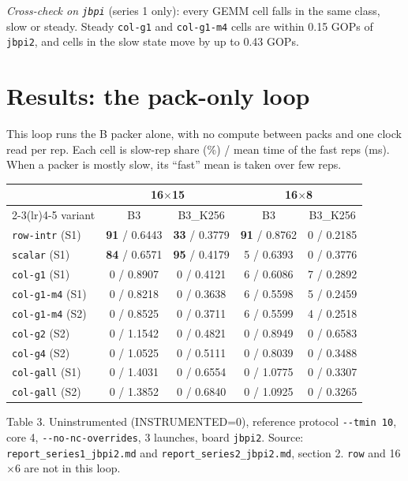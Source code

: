 \documentclass[10pt,a4paper]{article}
\newcommand{\bad}[1]{\textcolor{red!70!black}{\textbf{#1}}}
\begin{document}
\emph{Cross-check on \texttt{jbpi}} (series 1 only): every GEMM cell falls in the same class, slow or steady. Steady \texttt{col-g1} and
\texttt{col-g1-m4} cells are within 0.15 GOPs of \texttt{jbpi2}, and cells in the slow state move by up to 0.43 GOPs.

\clearpage
\section{Results: the pack-only loop}
\label{sec:packonly}
This loop runs the B packer alone, with no compute between packs and one clock read per rep. Each cell is slow-rep share (\%) /
mean time of the fast reps (ms). When a packer is mostly slow, its ``fast'' mean is taken over few reps.

\begin{center}\footnotesize\setlength{\tabcolsep}{4pt}
\begin{tabular}{@{}lcccc@{}}
\toprule
 & \multicolumn{2}{c}{16$\times$15} & \multicolumn{2}{c}{16$\times$8} \\
\cmidrule(lr){2-3}\cmidrule(lr){4-5}
variant & B3 & B3\_K256 & B3 & B3\_K256 \\
\midrule
\texttt{row-intr} (S1) & \bad{91} / 0.6443 & \bad{33} / 0.3779 & \bad{91} / 0.8762 & 0 / 0.2185 \\
\texttt{scalar} (S1) & \bad{84} / 0.6571 & \bad{95} / 0.4179 & 5 / 0.6393 & 0 / 0.3776 \\
\texttt{col-g1} (S1) & 0 / 0.8907 & 0 / 0.4121 & 6 / 0.6086 & 7 / 0.2892 \\
\texttt{col-g1-m4} (S1) & 0 / 0.8218 & 0 / 0.3638 & 6 / 0.5598 & 5 / 0.2459 \\
\texttt{col-g1-m4} (S2) & 0 / 0.8525 & 0 / 0.3711 & 6 / 0.5599 & 4 / 0.2518 \\
\texttt{col-g2} (S2) & 0 / 1.1542 & 0 / 0.4821 & 0 / 0.8949 & 0 / 0.6583 \\
\texttt{col-g4} (S2) & 0 / 1.0525 & 0 / 0.5111 & 0 / 0.8039 & 0 / 0.3488 \\
\texttt{col-gall} (S1) & 0 / 1.4031 & 0 / 0.6554 & 0 / 1.0775 & 0 / 0.3307 \\
\texttt{col-gall} (S2) & 0 / 1.3852 & 0 / 0.6840 & 0 / 1.0925 & 0 / 0.3265 \\
\bottomrule
\end{tabular}
\end{center}
{\footnotesize Table 3. Uninstrumented (INSTRUMENTED=0), reference protocol \texttt{-{}-tmin 10}, core 4, \texttt{-{}-no-nc-overrides}, 3 launches, board \texttt{jbpi2}.
Source: \texttt{report\_series1\_jbpi2.md} and \texttt{report\_series2\_jbpi2.md}, section 2. \texttt{row} and 16$\times$6 are not in this loop.}
\end{document}

